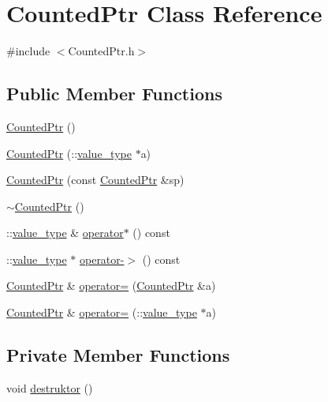 \hypertarget{classCountedPtr}{\section{\-Counted\-Ptr \-Class \-Reference}
\label{classCountedPtr}
}


{\ttfamily \#include $<$\-Counted\-Ptr.\-h$>$}

\subsection*{\-Public \-Member \-Functions}
\begin{DoxyCompactItemize}
\item 
\hyperlink{classCountedPtr_af46db3fe69af0f11d3cacf8edfb2600c}{\-Counted\-Ptr} ()
\item 
\hyperlink{classCountedPtr_a7ffa2e174931791a6284125bba67d941}{\-Counted\-Ptr} (\-::\hyperlink{CountedPtr_8h_a29b8e20df76c705cc065fde787679528}{value\-\_\-type} $\ast$a)
\item 
\hyperlink{classCountedPtr_af96d402bd39127052609c7102f5e0046}{\-Counted\-Ptr} (const \hyperlink{classCountedPtr}{\-Counted\-Ptr} \&sp)
\item 
\hyperlink{classCountedPtr_a4905b1409d49841a55ebf49de64e20f4}{$\sim$\-Counted\-Ptr} ()
\item 
\-::\hyperlink{CountedPtr_8h_a29b8e20df76c705cc065fde787679528}{value\-\_\-type} \& \hyperlink{classCountedPtr_a53b63d1bc56aefbf466102c93d60f1fd}{operator$\ast$} () const 
\item 
\-::\hyperlink{CountedPtr_8h_a29b8e20df76c705cc065fde787679528}{value\-\_\-type} $\ast$ \hyperlink{classCountedPtr_ae19e19447b3aaa859262eb5fa83ab2e9}{operator-\/$>$} () const 
\item 
\hyperlink{classCountedPtr}{\-Counted\-Ptr} \& \hyperlink{classCountedPtr_aea29fc341cc02e44f2352754bf77911a}{operator=} (\hyperlink{classCountedPtr}{\-Counted\-Ptr} \&a)
\item 
\hyperlink{classCountedPtr}{\-Counted\-Ptr} \& \hyperlink{classCountedPtr_ae3fa3784e4a5382c9f5939ae9ea3aff4}{operator=} (\-::\hyperlink{CountedPtr_8h_a29b8e20df76c705cc065fde787679528}{value\-\_\-type} $\ast$a)
\end{DoxyCompactItemize}
\subsection*{\-Private \-Member \-Functions}
\begin{DoxyCompactItemize}
\item 
void \hyperlink{classCountedPtr_a829d8216b1fe4bdf345aa8a6f964a549}{destruktor} ()
\end{DoxyCompactItemize}
